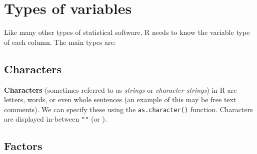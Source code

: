 \documentclass[]{book}
\makeatletter
\newenvironment{Shaded}{\begin{snugshade}}{\end{snugshade}}
\newcommand{\KeywordTok}[1]{\textcolor[rgb]{0.13,0.29,0.53}{\textbf{#1}}}
\newcommand{\DecValTok}[1]{\textcolor[rgb]{0.00,0.00,0.81}{#1}}
\newcommand{\StringTok}[1]{\textcolor[rgb]{0.31,0.60,0.02}{#1}}
\newcommand{\CommentTok}[1]{\textcolor[rgb]{0.56,0.35,0.01}{\textit{#1}}}
\newcommand{\OperatorTok}[1]{\textcolor[rgb]{0.81,0.36,0.00}{\textbf{#1}}}
\newcommand{\NormalTok}[1]{#1}
\newenvironment{kframe}{%
\medskip{}
\setlength{\fboxsep}{.8em}
 \def\at@end@of@kframe{}%
 \ifinner\ifhmode%
  \def\at@end@of@kframe{\end{minipage}}%
  \begin{minipage}{\columnwidth}%
 \fi\fi%
 \def\FrameCommand##1{\hskip\@totalleftmargin \hskip-\fboxsep
 \colorbox{shadecolor}{##1}\hskip-\fboxsep
     \hskip-\linewidth \hskip-\@totalleftmargin \hskip\columnwidth}%
 \MakeFramed {\advance\hsize-\width
   \@totalleftmargin\z@ \linewidth\hsize
   \@setminipage}}%
 {\par\unskip\endMakeFramed%
 \at@end@of@kframe}
\renewenvironment{Shaded}{\begin{kframe}}{\end{kframe}}
\makeatother
\begin{document}
\begin{Shaded}
\end{Shaded}

\section{Types of variables}\label{types-of-variables}

Like many other types of statistical software, R needs to know the
variable type of each column. The main types are:

\subsection{Characters}\label{characters}

\textbf{Characters} (sometimes referred to as \emph{strings} or
\emph{character strings}) in R are letters, words, or even whole
sentences (an example of this may be free text comments). We can specify
these using the \texttt{as.character()} function. Characters are
displayed in-between \texttt{""} (or
\texttt{\textquotesingle{}\textquotesingle{}}).

\subsection{Factors}\label{factors}
\end{document}
